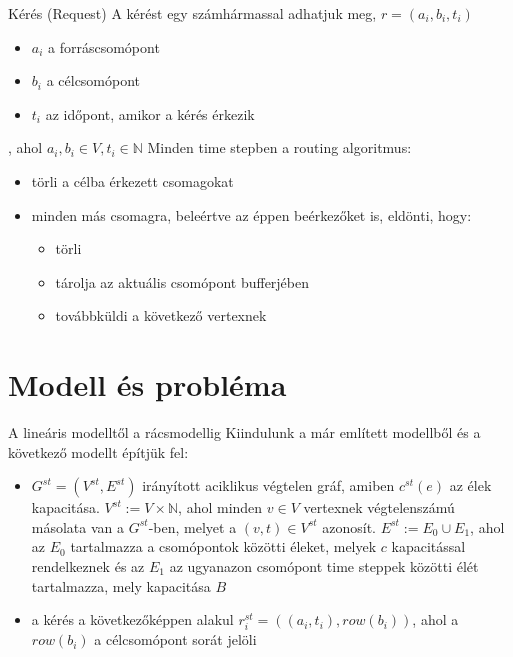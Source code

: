 \documentclass[10pt]{beamer}
\begin{document}
\begin{frame}{Kérés (Request)}
  A kérést egy számhármassal adhatjuk meg, $ r = \left(a_i, b_i, t_i \right)  $
  \begin{itemize}
  	\item $ a_i $ a forráscsomópont
  	\item $ b_i $ a célcsomópont
  	\item $ t_i $ az időpont, amikor a kérés érkezik
  \end{itemize}
 , ahol $ a_i, b_i \in V, t_i \in \mathbb{N} $\newline
 Minden time stepben a routing algoritmus:
 \begin{itemize}
 	\item törli a célba érkezett csomagokat
 	\item minden más csomagra, beleértve az éppen beérkezőket is, eldönti, hogy:
	 \begin{itemize}
	 	\item törli
	 	\item tárolja az aktuális csomópont bufferjében
	 	\item továbbküldi a következő vertexnek
	 \end{itemize}
 \end{itemize}
\end{frame}

\section{Modell és probléma}

\begin{frame}{A lineáris modelltől a rácsmodellig}
	Kiindulunk a már említett modellből és a következő modellt építjük fel:
	\begin{itemize}
		\item 
		$ G^{st} = \left( V^{st}, E^{st} \right) $ irányított aciklikus végtelen gráf, amiben $ c^{st}\left(e \right) $ az élek kapacitása. $ V^{st} := V \times \mathbb{N} $, ahol minden $ v \in V $ vertexnek végtelenszámú másolata van a $ G^{st} $-ben, melyet a $ \left( v, t\right) \in V^{st} $ azonosít. $ E^{st} := E_0 \cup E_1 $, ahol az $ E_0 $ tartalmazza a csomópontok közötti éleket, melyek $ c $ kapacitással rendelkeznek és az $ E_1 $ az ugyanazon csomópont time steppek közötti élét tartalmazza, mely kapacitása $ B $
 		\item  a kérés a következőképpen alakul $ r_i^{st} = \left( \left( a_i, t_i\right) , row(b_i)\right) $, ahol a $ row(b_i) $ a célcsomópont sorát jelöli
	\end{itemize}
\end{frame}
\end{document}
